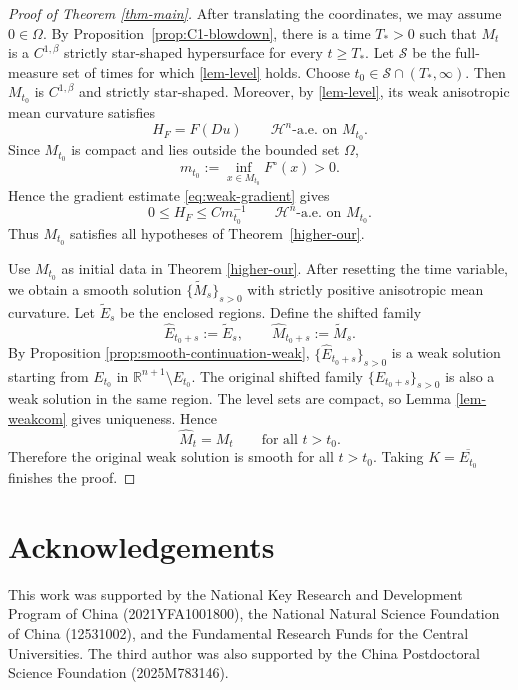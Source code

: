 \documentclass[11pt,reqno]{amsart}
\theoremstyle{definition}
\theoremstyle{remark}
\numberwithin{equation}{section}
\begin{document}
\begin{proof}[Proof of Theorem \ref{thm-main}]
After translating the coordinates, we may assume $0\in\Omega$. By
Proposition~\ref{prop:C1-blowdown}, there is a time $T_*>0$ such that
$M_t$ is a $C^{1,\beta}$ strictly star-shaped hypersurface for every
$t\geq T_*$. Let $\mathcal S$ be the full-measure set of times for which
\eqref{lem-level} holds. Choose $t_0\in \mathcal S\cap(T_*,\infty)$.
Then $M_{t_0}$ is $C^{1,\beta}$ and strictly star-shaped. Moreover, by
\eqref{lem-level}, its weak anisotropic mean curvature satisfies
\begin{equation*}
 H_F=F(Du)
 \qquad\mathcal H^n\text{-a.e. on }M_{t_0}.
\end{equation*}
Since $M_{t_0}$ is compact and lies outside the bounded set $\Omega$,
\begin{equation*}
 m_{t_0}:=\inf_{x\in M_{t_0}}F^\circ(x)>0.
\end{equation*}
Hence the gradient estimate \eqref{eq:weak-gradient} gives
\begin{equation*}
 0\leq H_F\leq C m_{t_0}^{-1}
 \qquad\mathcal H^n\text{-a.e. on }M_{t_0}.
\end{equation*}
Thus $M_{t_0}$ satisfies all hypotheses of Theorem~\ref{higher-our}.

Use $M_{t_0}$ as initial data in Theorem \ref{higher-our}. After resetting the time variable, we obtain a smooth solution $\{\widetilde M_s\}_{s>0}$ with strictly positive anisotropic mean curvature. Let $\widetilde E_s$ be the enclosed regions. Define the shifted family
	\begin{equation*}
	 \widehat E_{t_0+s}:=\widetilde E_s,
	 \qquad
	 \widehat M_{t_0+s}:=\widetilde M_s.
	\end{equation*}
	By Proposition \ref{prop:smooth-continuation-weak}, $\{\widehat E_{t_0+s}\}_{s>0}$ is a weak solution starting from $E_{t_0}$ in $\mathbb R^{n+1}\setminus E_{t_0}$. The original shifted family $\{E_{t_0+s}\}_{s>0}$ is also a weak solution in the same region. The level sets are compact, so Lemma \ref{lem-weakcom} gives uniqueness. Hence
	\begin{equation*}
	 \widehat M_t=M_t
	 \qquad\text{for all }t>t_0.
	\end{equation*}
	Therefore the original weak solution is smooth for all $t>t_0$. Taking $K=\overline{E_{t_0}}$ finishes the proof. 
\end{proof}
	


	

\section*{Acknowledgements}
This work was supported by the National Key Research and Development Program of China (2021YFA1001800), the National Natural Science Foundation of China (12531002), and the Fundamental Research Funds for the Central Universities. The third author was also supported by the China Postdoctoral Science Foundation (2025M783146).
\end{document}
